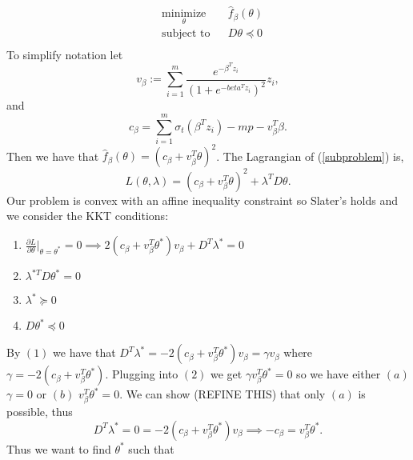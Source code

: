 \documentclass[12pt]{article}
\begin{document}
\begin{equation}
\label{subproblem}
\begin{aligned}
& \underset{\theta}{\text{minimize}}
& & \hat{f}_{\beta}(\theta) \\
& \text{subject to}
& & D\theta \preceq 0 \\
\end{aligned}
\end{equation}
 To simplify notation let
\begin{equation*}
v_{\beta} := \sum \limits_{i=1}^{m} \frac{e^{-\beta^{T}z_{i}}}{(1+e^{-beta^{T}z_{i}})^{2}}z_{i},
\end{equation*}
and 
\begin{equation*}
c_{\beta} = \sum \limits_{i=1}^{m} \sigma_{t}(\beta^{T}z_{i}) - mp - v_{\beta}^{T}\beta.
\end{equation*}
Then we have that $\hat{f}_{\beta}(\theta) = (c_{\beta} + v_{\beta}^{T}\theta)^{2}$. The Lagrangian of (\ref{subproblem}) is,
\begin{equation*}
L(\theta, \lambda) = (c_{\beta} + v_{\beta}^{T}\theta)^{2} + \lambda^{T}D\theta.
\end{equation*}
Our problem is convex with an affine inequality constraint so Slater's holds and we consider the KKT conditions:
\begin{enumerate}
\item $\frac{\partial L}{\partial \theta} \lvert_{\theta = \theta^{*}} = 0 \implies 2(c_{\beta} + v_{\beta}^{T} \theta^{*})v_{\beta} + D^{T}\lambda^{*} = 0$ \\
\item $\lambda^{*T}D\theta^{*} = 0$ \\
\item $\lambda^{*} \succeq 0$ \\
\item $D\theta^{*} \preceq 0 $
\end{enumerate}
By $(1)$ we have that $D^{T}\lambda^{*} = -2(c_{\beta} + v_{\beta}^{T}\theta^{*})v_{\beta} = \gamma v_{\beta}$ where $\gamma = -2(c_{\beta} + v_{\beta}^{T}\theta^{*})$. Plugging into $(2)$ we get $\gamma v_{\beta}^{T}\theta^{*} = 0$ so we have either $(a)$ $\gamma = 0$ or $(b)$ $v_{\beta}^{T}\theta^{*} = 0$. We can show (REFINE THIS) that only $(a)$ is possible, thus 
\begin{equation*}
D^{T}\lambda^{*} = 0 = -2(c_{\beta} + v_{\beta}^{T}\theta^{*}) v_{\beta} \implies -c_{\beta} = v_{\beta}^{T}\theta^{*}.
\end{equation*}
Thus we want to find $\theta^{*}$ such that 
\end{document}
